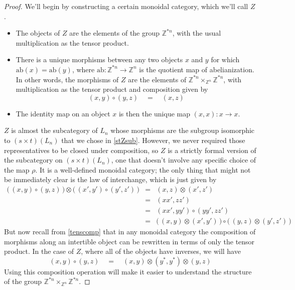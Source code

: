 \documentclass{amsbook} %
\numberwithin{section}{chapter}
\begin{document}
\begin{proof}
We'll begin by constructing a certain monoidal category, which we'll call $Z$. 
\begin{itemize}
\item The objects of $Z$ are the elements of the group $\mathbb{Z}^{\ast n}$, with the usual multiplication as the tensor product.
\item There is a unique morphisms between any two objects $x$ and $y$ for which $\mathrm{ab}(x) = \mathrm{ab}(y)$, where $\mathrm{ab}: \mathbb{Z}^{\ast n} \to \mathbb{Z}^n$ is the quotient map of abelianization. In other words, the morphisms of $Z$ are the elements of $\mathbb{Z}^{\ast n} \times_{\mathbb{Z}^n} \mathbb{Z}^{\ast n}$, with multiplication as the tensor product and composition given by
\[ (x,y) \circ (y,z) \quad = \quad (x, z) \]
\item The identity map on an object $x$ is then the unique map $(x,x) : x \to x$.
\end{itemize}
$Z$ is almost the subcategory of $L_n$ whose morphisms are the subgroup isomorphic to $(s \times t)(L_n)$ that we chose in \cref{stZsub}. However, we never required those representatives to be closed under composition, so $Z$ is a strictly formal version of the subcategory on $(s \times t)(L_n)$, one that doesn't involve any specific choice of the map $\rho$. It is a well-defined monoidal category; the only thing that might not be immediately clear is the law of interchange, which is just given by
\[ \begin{array}{rll}
			\big( \, (x,y) \circ (y,z) \, \big) \otimes \big( \, (x',y') \circ (y',z') \, \big) & = & (x,z) \otimes (x',z') \\
			& = & (xx',zz') \\
			& = & (xx',yy') \circ (yy',zz') \\
			& = & \big( \, (x,y) \otimes (x',y') \, \big) \circ \big( \, (y,z) \otimes (y',z') \, \big) 
		\end{array}
\]
But now recall from \cref{tenscomp} that in any monoidal category the composition of morphisms along an intertible object can be rewritten in terms of only the tensor product. In the case of $Z$, where all of the objects have inverses, we will have
\[ (x,y) \circ (y, z) \quad = \quad (x, y) \otimes (y^*, y^*) \otimes (y, z) \]
Using this composition operation will make it easier to understand the structure of the group $\mathbb{Z}^{\ast n} \times_{\mathbb{Z}^n} \mathbb{Z}^{\ast n}$.


\end{proof}
\end{document}
